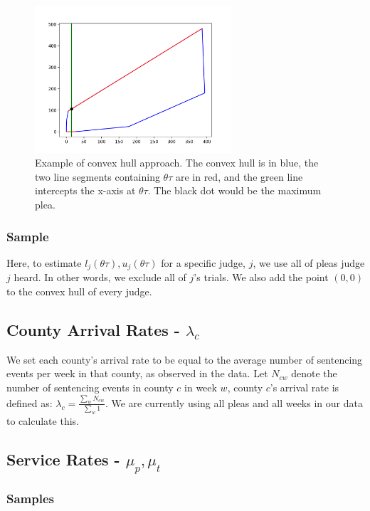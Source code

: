 \documentclass[11pt]{article}
\theoremstyle{ModifiedStyle}
\begin{document}
    \begin{figure}[H]
      \centering
      \includegraphics[width=0.65\textwidth]{../../output/figures/Exploration/convex_hull_max.png}
      \caption{Example of convex hull approach. The convex hull is in blue, the two line segments containing $\theta \tau$ are in red, and the green line intercepts the x-axis at $\theta \tau$. The black dot would be the maximum plea.}
      \label{fig-convex-hull}
    \end{figure}

    \subsubsection{Sample}
      Here, to estimate $l_j(\theta \tau),u_j(\theta \tau)$ for a specific judge, $j$, we use all of pleas judge $j$ heard. In other words, we exclude all of $j$'s trials. We also add the point $(0,0)$ to the convex hull of every judge.

  \subsection{County Arrival Rates - $\lambda_c$}
    \label{lambda_c-estimation}
    We set each county's arrival rate to be equal to the average number of sentencing events per week in that county, as observed in the data. Let $N_{cw}$ denote the number of sentencing events in county $c$ in week $w$, county $c$'s arrival rate is defined as: $\lambda_c = \frac{\sum_w N_{cw}}{\sum_w 1}$. We are currently using all pleas and all weeks in our data to calculate this.

  \subsection{Service Rates - $\mu_p,\mu_t$}
    \label{service_rate-estimation}
    \subsubsection{Samples}
\end{document}
